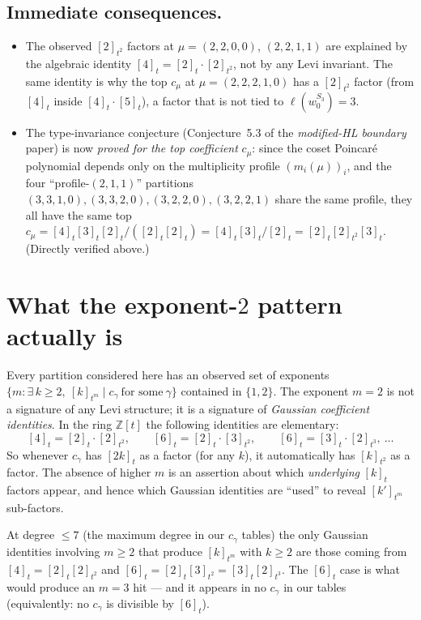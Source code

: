 \documentclass[11pt,letterpaper]{amsart}
\theoremstyle{definition}
\theoremstyle{remark}
\newcommand{\gauss}[1]{[#1]_{t}}
\newcommand{\gaussm}[2]{[#1]_{t^{#2}}}
\begin{document}
\subsection*{Immediate consequences.}
\begin{itemize}
\item The observed $[2]_{t^2}$ factors at $\mu = (2,2,0,0)$, $(2,2,1,1)$
  are explained by the algebraic identity $\gauss{4} = \gauss{2}\cdot\gaussm{2}{2}$,
  not by any Levi invariant. The same identity is why the top $c_\mu$ at
  $\mu = (2,2,2,1,0)$ has a $[2]_{t^2}$ factor (from $[4]_t$ inside
  $[4]_t\cdot[5]_t$), a factor that is not tied to $\ell(w_0^{S_3}) = 3$.
\item The type-invariance conjecture (Conjecture~5.3 of the
  \emph{modified-HL boundary} paper) is now \emph{proved for the top
  coefficient} $c_\mu$: since the coset Poincar\'e polynomial depends
  only on the multiplicity profile $(m_i(\mu))_i$, and the four
  ``profile-$(2,1,1)$'' partitions
  $(3,3,1,0), (3,3,2,0), (3,2,2,0), (3,2,2,1)$ share the same profile,
  they all have the same top $c_\mu = \gauss{4}\gauss{3}\gauss{2}/(\gauss{2}\gauss{2}) = \gauss{4}\gauss{3}/\gauss{2} = \gauss{2}\gaussm{2}{2}\gauss{3}$. (Directly verified above.)
\end{itemize}

\section{What the exponent-$2$ pattern actually is}

Every partition considered here has an observed set of exponents
$\{m : \exists\, k \ge 2,\ [k]_{t^m} \mid c_\gamma\ \text{for some}\ \gamma\}$
contained in $\{1, 2\}$. The exponent $m = 2$ is not a signature of
any Levi structure; it is a signature of \emph{Gaussian coefficient
identities}. In the ring $\mathbb{Z}[t]$ the following identities are
elementary:
\[
  \gauss{4} = \gauss{2}\cdot\gaussm{2}{2}, \qquad
  \gauss{6} = \gauss{2}\cdot\gaussm{3}{2}, \qquad
  \gauss{6} = \gauss{3}\cdot\gaussm{2}{3},\ \ldots
\]
So whenever $c_\gamma$ has $[2k]_t$ as a factor (for any $k$), it
automatically has $[k]_{t^2}$ as a factor. The absence of higher $m$ is
an assertion about which \emph{underlying} $\gauss{k}$ factors appear,
and hence which Gaussian identities are ``used'' to reveal $[k']_{t^m}$
sub-factors.

At degree $\le 7$ (the maximum degree in our $c_\gamma$ tables) the only
Gaussian identities involving $m \ge 2$ that produce $[k]_{t^m}$ with
$k \ge 2$ are those coming from $[4]_t = [2]_t[2]_{t^2}$ and
$[6]_t = [2]_t[3]_{t^2} = [3]_t[2]_{t^3}$. The $[6]_t$ case is what
would produce an $m = 3$ hit --- and it appears in no $c_\gamma$ in our
tables (equivalently: no $c_\gamma$ is divisible by $[6]_t$).
\end{document}
